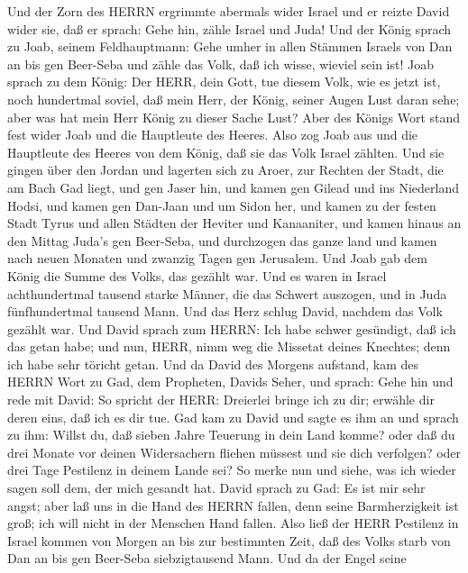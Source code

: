  Und der Zorn des HERRN ergrimmte abermals wider Israel und
er reizte David wider sie, daß er sprach: Gehe hin, zähle Israel und
Juda!  Und der König sprach zu Joab, seinem Feldhauptmann:
Gehe umher in allen Stämmen Israels von Dan an bis gen Beer-Seba und
zähle das Volk, daß ich wisse, wieviel sein ist!  Joab
sprach zu dem König: Der HERR, dein Gott, tue diesem Volk, wie es jetzt
ist, noch hundertmal soviel, daß mein Herr, der König, seiner Augen Lust
daran sehe; aber was hat mein Herr König zu dieser Sache Lust?
 Aber des Königs Wort stand fest wider Joab und die
Hauptleute des Heeres. Also zog Joab aus und die Hauptleute des Heeres
von dem König, daß sie das Volk Israel zählten.  Und sie
gingen über den Jordan und lagerten sich zu Aroer, zur Rechten der
Stadt, die am Bach Gad liegt, und gen Jaser hin,  und kamen
gen Gilead und ins Niederland Hodsi, und kamen gen Dan-Jaan und um Sidon
her,  und kamen zu der festen Stadt Tyrus und allen Städten
der Heviter und Kanaaniter, und kamen hinaus an den Mittag Juda's gen
Beer-Seba,  und durchzogen das ganze land und kamen nach
neuen Monaten und zwanzig Tagen gen Jerusalem.  Und Joab gab
dem König die Summe des Volks, das gezählt war. Und es waren in Israel
achthundertmal tausend starke Männer, die das Schwert auszogen, und in
Juda fünfhundertmal tausend Mann.  Und das Herz schlug
David, nachdem das Volk gezählt war. Und David sprach zum HERRN: Ich
habe schwer gesündigt, daß ich das getan habe; und nun, HERR, nimm weg
die Missetat deines Knechtes; denn ich habe sehr töricht getan.
 Und da David des Morgens aufstand, kam des HERRN Wort zu
Gad, dem Propheten, Davids Seher, und sprach:  Gehe hin und
rede mit David: So spricht der HERR: Dreierlei bringe ich zu dir;
erwähle dir deren eins, daß ich es dir tue.  Gad kam zu
David und sagte es ihm an und sprach zu ihm: Willst du, daß sieben Jahre
Teuerung in dein Land komme? oder daß du drei Monate vor deinen
Widersachern fliehen müssest und sie dich verfolgen? oder drei Tage
Pestilenz in deinem Lande sei? So merke nun und siehe, was ich wieder
sagen soll dem, der mich gesandt hat.  David sprach zu Gad:
Es ist mir sehr angst; aber laß uns in die Hand des HERRN fallen, denn
seine Barmherzigkeit ist groß; ich will nicht in der Menschen Hand
fallen.  Also ließ der HERR Pestilenz in Israel kommen von
Morgen an bis zur bestimmten Zeit, daß des Volks starb von Dan an bis
gen Beer-Seba siebzigtausend Mann.  Und da der Engel seine
